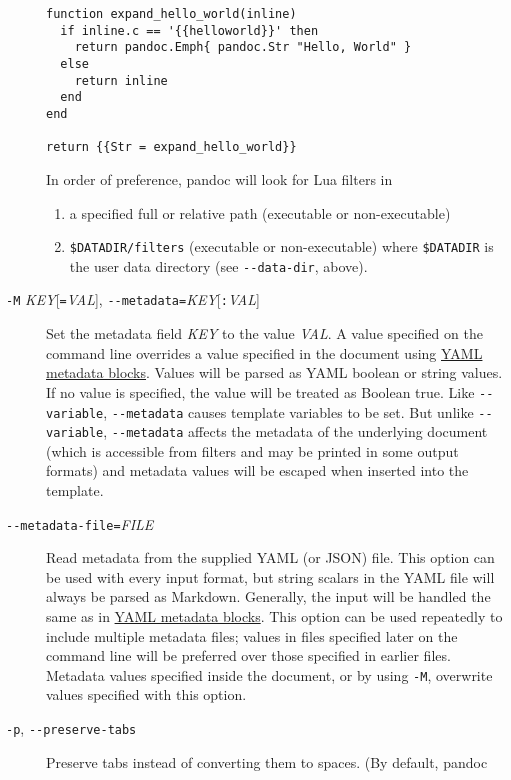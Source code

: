 \documentclass[]{article}
\begin{document}
\begin{description}
\begin{verbatim}
function expand_hello_world(inline)
  if inline.c == '{{helloworld}}' then
    return pandoc.Emph{ pandoc.Str "Hello, World" }
  else
    return inline
  end
end

return {{Str = expand_hello_world}}
\end{verbatim}

In order of preference, pandoc will look for Lua filters in

\begin{enumerate}
\def\labelenumi{\arabic{enumi}.}
\item
  a specified full or relative path (executable or non-executable)
\item
  \texttt{\$DATADIR/filters} (executable or non-executable) where
  \texttt{\$DATADIR} is the user data directory (see
  \texttt{-\/-data-dir}, above).
\end{enumerate}
\item[\texttt{-M} \emph{KEY}{[}\texttt{=}\emph{VAL}{]},
\texttt{-\/-metadata=}\emph{KEY}{[}\texttt{:}\emph{VAL}{]}]
Set the metadata field \emph{KEY} to the value \emph{VAL}. A value
specified on the command line overrides a value specified in the
document using \protect\hyperlink{extension-yaml_metadata_block}{YAML
metadata blocks}. Values will be parsed as YAML boolean or string
values. If no value is specified, the value will be treated as Boolean
true. Like \texttt{-\/-variable}, \texttt{-\/-metadata} causes template
variables to be set. But unlike \texttt{-\/-variable},
\texttt{-\/-metadata} affects the metadata of the underlying document
(which is accessible from filters and may be printed in some output
formats) and metadata values will be escaped when inserted into the
template.
\item[\texttt{-\/-metadata-file=}\emph{FILE}]
Read metadata from the supplied YAML (or JSON) file. This option can be
used with every input format, but string scalars in the YAML file will
always be parsed as Markdown. Generally, the input will be handled the
same as in \protect\hyperlink{extension-yaml_metadata_block}{YAML
metadata blocks}. This option can be used repeatedly to include multiple
metadata files; values in files specified later on the command line will
be preferred over those specified in earlier files. Metadata values
specified inside the document, or by using \texttt{-M}, overwrite values
specified with this option.
\item[\texttt{-p}, \texttt{-\/-preserve-tabs}]
Preserve tabs instead of converting them to spaces. (By default, pandoc

\end{description}
\end{document}
